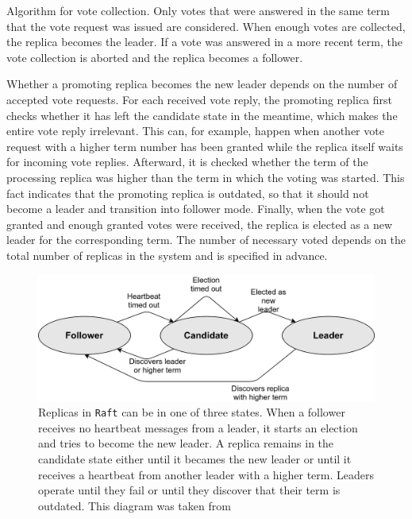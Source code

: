 \begin{algorithm}[H]\caption{Algorithm for vote collection. Only votes that were answered in the same term that the vote request was issued are considered. When enough votes are collected, the replica becomes the leader. If a vote was answered in a more recent term, the vote collection is aborted and the replica becomes a follower.}\label{algo:VoteCollection}

\BlankLine

\end{algorithm}

Whether a promoting replica becomes the new leader depends on the number of accepted vote requests.
For each received vote reply, the promoting replica first checks whether it has left the candidate state in the meantime, which makes the entire vote reply irrelevant.
This can, for example, happen when another vote request with a higher term number has been granted while the replica itself waits for incoming vote replies.
Afterward, it is checked whether the term of the processing replica was higher than the term in which the voting was started.
This fact indicates that the promoting replica is outdated, so that it should not become a leader and transition into follower mode.
Finally, when the vote got granted and enough granted votes were received, the replica is elected as a new leader for the corresponding term.
The number of necessary voted depends on the total number of replicas in the system and is specified in advance.

\begin{figure}[!hb]
	\centering
	\includegraphics[width=0.75\linewidth]{images/RaftServerStates}
	\caption{Replicas in \texttt{Raft} can be in one of three states. When a follower receives no heartbeat messages from a leader, it starts an election and tries to become the new leader. A replica remains in the candidate state either until it becames the new leader or until it receives a heartbeat from another leader with a higher term. Leaders operate until they fail or until they discover that their term is outdated. This diagram was taken from~\cite{RaftConsensusPaper}}
	\label{fig:RaftServerStates}
\end{figure}


